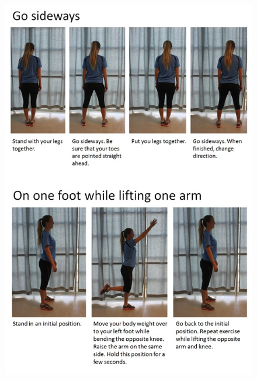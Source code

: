 \begin{figure} [ht!]
\centering
\includegraphics[scale=0.8]{GoSideways.jpg}
\label{gosideways}
\end{figure} 


